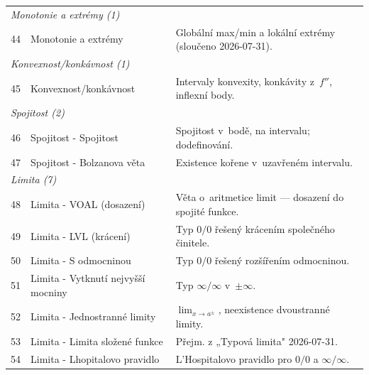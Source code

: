 \documentclass[11pt,a4paper]{article}
\begin{document}
\begin{longtable}{p{1cm}p{6cm}p{8.5cm}}
  \multicolumn{3}{l}{\textit{Monotonie a extrémy (1)}} \\[2pt]
  44 & Monotonie a extrémy                     & Globální max/min a lokální extrémy (sloučeno 2026-07-31). \\[4pt]

  \multicolumn{3}{l}{\textit{Konvexnost/konkávnost (1)}} \\[2pt]
  45 & Konvexnost/konkávnost                   & Intervaly konvexity, konkávity z~$f''$, inflexní body. \\[4pt]

  \multicolumn{3}{l}{\textit{Spojitost (2)}} \\[2pt]
  46 & Spojitost - Spojitost                   & Spojitost v~bodě, na intervalu; dodefinování. \\
  47 & Spojitost - Bolzanova věta              & Existence kořene v~uzavřeném intervalu. \\[4pt]

  \multicolumn{3}{l}{\textit{Limita (7)}} \\[2pt]
  48 & Limita - VOAL (dosazení)                & Věta o~aritmetice limit --- dosazení do spojité funkce. \\
  49 & Limita - LVL (krácení)                  & Typ $0/0$ řešený krácením společného činitele. \\
  50 & Limita - S odmocninou                   & Typ $0/0$ řešený rozšířením odmocninou. \\
  51 & Limita - Vytknutí nejvyšší mocniny      & Typ $\infty/\infty$ v~$\pm\infty$. \\
  52 & Limita - Jednostranné limity            & $\lim_{x \to a^\pm}$, neexistence dvoustranné limity. \\
  53 & Limita - Limita složené funkce          & Přejm. z „Typová limita" 2026-07-31. \\
  54 & Limita - Lhopitalovo pravidlo           & L'Hospitalovo pravidlo pro $0/0$ a $\infty/\infty$. \\[4pt]


\end{longtable}
\end{document}
